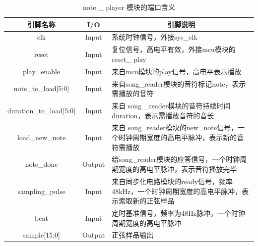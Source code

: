 \documentclass{../source/Experiment}
\begin{document}
                \begin{table}[H]
                    \caption{note \_ player 模块的端口含义}
                    \begin{tabular}{|c|c|p{}|}
                        \hline
                        引脚名称                        & I/O    & \multicolumn{1}{c|}{引脚说明}                              \\ \hline
                        clk                         & Input  & 系统时钟信号，外接sys\_clk                                      \\ \hline
                        reset                       & Input  & 复位信号，高电平有效，外接mcu模块的reset\_ play                        \\ \hline
                        play\_enable                & Input  & 来自mcu模块的play信号，高电平表示播放                                 \\ \hline
                        note\_to\_load{[}5:0{]}     & Input  & 来自song\_reader模块的音符标记note，表示需播放的音符                     \\ \hline
                        duration\_to\_load{[}5:0{]} & Input  & 来自 song \_reader模块的音符持续时间duration，表示需播放音符的音长           \\ \hline
                        load\_new\_note             & Input  & 来自 song\_reader模块的new\_note信号，一个时钟周期宽度的高电平脉冲，表示新的音符需播放 \\ \hline
                        note\_done                  & Output & 给song\_reader模块的应答信号，一个时钟周期宽度的高电平脉冲，表示音符播放完毕           \\ \hline
                        sampling\_pulse             & Input  & 来自同步化电路模块的ready信号，频率48kHz，一个时钟周期宽度的高电平脉冲，表示索取新的正弦样品    \\ \hline
                        beat                        & Input  & 定时基准信号，频率为48Hz脉冲，一个时钟周期宽度的高电平脉冲                        \\ \hline
                        sample{[}15:0{]}            & Output & 正弦样品输出                                                 \\ \hline
                    \end{tabular}
                \end{table}
\end{document}
